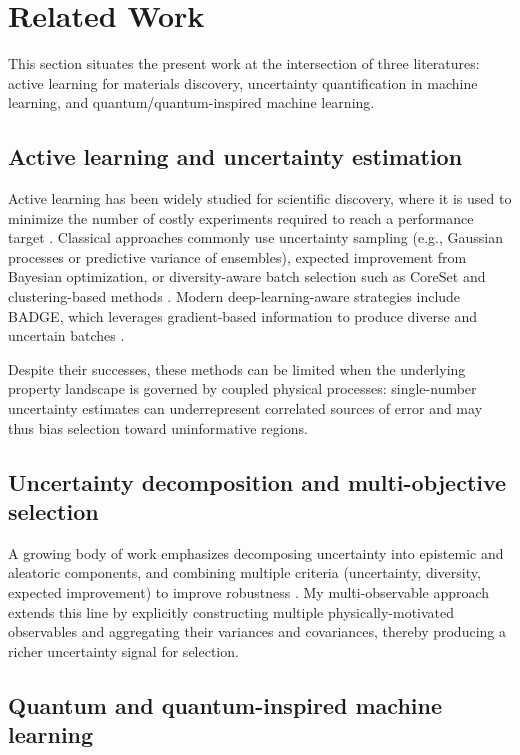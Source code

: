 \documentclass{article}
\begin{document}
\section{Related Work}
\label{sec:related}

This section situates the present work at the intersection of three literatures: active learning for materials discovery, uncertainty quantification in machine learning, and quantum/quantum-inspired machine learning.

\subsection{Active learning and uncertainty estimation}

Active learning has been widely studied for scientific discovery, where it is used to minimize the number of costly experiments required to reach a performance target \cite{lookman2019active, raccuglia2016machine}. Classical approaches commonly use uncertainty sampling (e.g., Gaussian processes or predictive variance of ensembles), expected improvement from Bayesian optimization, or diversity-aware batch selection such as CoreSet and clustering-based methods \cite{sener2017active}. Modern deep-learning-aware strategies include BADGE, which leverages gradient-based information to produce diverse and uncertain batches \cite{ash2019deep}.

Despite their successes, these methods can be limited when the underlying property landscape is governed by coupled physical processes: single-number uncertainty estimates can underrepresent correlated sources of error and may thus bias selection toward uninformative regions.

\subsection{Uncertainty decomposition and multi-objective selection}

A growing body of work emphasizes decomposing uncertainty into epistemic and aleatoric components, and combining multiple criteria (uncertainty, diversity, expected improvement) to improve robustness \cite{gal2016dropout, lakshminarayanan2017simple}. My multi-observable approach extends this line by explicitly constructing multiple physically-motivated observables and aggregating their variances and covariances, thereby producing a richer uncertainty signal for selection.

\subsection{Quantum and quantum-inspired machine learning}
\end{document}
